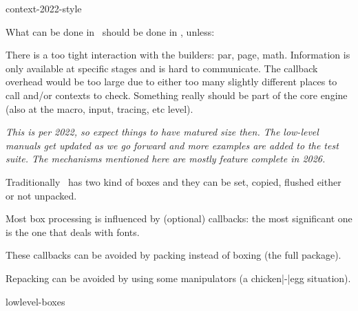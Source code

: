 
\environment context-2022-style

\startdocument
  [title={Injecting stuff},
   banner={fundamental or not},
   location={context\enspace {\bf 2022}\enspace meeting}]

\starttitle[title=Where to draw a line]

What can be done in \LUA\ should be done in \LUA, unless:

\startitemize
    \startitem
        There is a too tight interaction with the builders: par, page, math.
    \stopitem
    \startitem
        Information is only available at specific stages and is hard to
        communicate.
    \stopitem
    \startitem
        The callback overhead would be too large due to either too many
        slightly different places to call and/or contexts to check.
    \stopitem
    \startitem
        Something really should be part of the core engine (also at the
        macro, input, tracing, etc level).
    \stopitem
\stopitemize

\blank[3*big]

{\em This is per 2022, so expect things to have matured size then. The low-level
manuals get updated as we go forward and more examples are added to the test
suite. The mechanisms mentioned here are mostly feature complete in 2026.}

\stoptitle

\starttitle[title=Boxes]

\startitemize

\startitem
    Traditionally \TEX\ has two kind of boxes and they can be set, copied,
    flushed either or not unpacked.
\stopitem

\startitem
    Most box processing is influenced by (optional) callbacks: the most
    significant one is the one that deals with fonts.
\stopitem

\startitem
    These callbacks can be avoided by packing instead of boxing (the full
    package).
\stopitem

\startitem
    Repacking can be avoided by using some manipulators (a chicken|-|egg
    situation).
\stopitem

\blank[3*big]

\starttyping
lowlevel-boxes
\stoptyping

\stopitemize

\stoptitle

\starttitle[title=Leaders]

\startitemize

